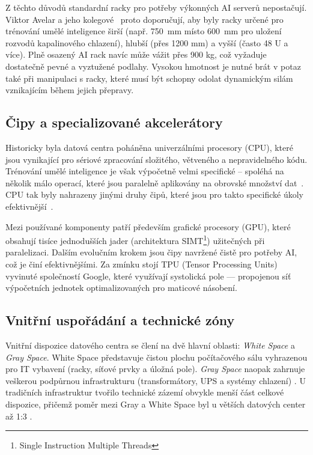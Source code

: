 Z těchto důvodů standardní racky pro potřeby výkonných AI serverů nepostačují. Viktor Avelar a jeho kolegové~\cite[s. 13--14]{avelar_ai_2023} proto doporučují, aby byly racky určené pro trénování umělé inteligence širší (např. 750~mm místo 600~mm pro uložení rozvodů kapalinového chlazení), hlubší (přes 1200 mm) a vyšší (často 48 U a více). Plně osazený AI rack navíc může vážit přes 900 kg, což vyžaduje dostatečně pevné a vyztužené podlahy. Vysokou hmotnost je nutné brát v potaz také při manipulaci s racky, které musí být schopny odolat dynamickým silám vznikajícím během jejich přepravy.

\subsection{Čipy a specializované akcelerátory}
\label{subsec:hardware}

Historicky byla datová centra poháněna univerzálními procesory (CPU), které jsou vynikající pro sériové zpracování složitého, větveného a nepravidelného kódu. Trénování umělé inteligence je však výpočetně velmi specifické -- spoléhá na několik málo operací, které jsou paralelně aplikovány na obrovské množství dat~\cite[s. 133--134]{barroso_data_2026}. CPU tak byly nahrazeny jinými druhy čipů, které jsou pro takto specifické úkoly efektivnější~\cite[s. 1391]{phani_suresh_paladugu_evolution_2025}.

Mezi používané komponenty patří především grafické procesory (GPU), které obsahují tisíce jednodušších jader (architektura SIMT\footnote{Single Instruction Multiple Threads}) užitečných při paralelizaci. Dalším evolučním krokem jsou čipy navržené čistě pro potřeby AI, což je činí efektivnějšími. Za zmínku stojí TPU (Tensor Processing Units) vyvinuté společností Google, které využívají systolická pole –– propojenou síť výpočetních jednotek optimalizovaných pro maticové násobení. \cite[s. 134--139]{barroso_data_2026}

\subsection{Vnitřní uspořádání a technické zóny}
\label{subsec:dispozice}

Vnitřní dispozice datového centra se člení na dvě hlavní oblasti: \textit{White Space} a \textit{Gray Space}. White Space představuje čistou plochu počítačového sálu vyhrazenou pro IT vybavení (racky, síťové prvky a úložná pole). \textit{Gray Space} naopak zahrnuje veškerou podpůrnou infrastrukturu (transformátory, UPS %
a systémy chlazení) \cite[s. 300]{geng_data_2014}. U tradičních infrastruktur tvořilo technické zázemí obvykle menší část celkové dispozice, přičemž poměr mezi Gray a White Space byl u větších datových center až 1:3 \cite{butler_unlocking_2025}.

